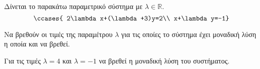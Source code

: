Δίνεται το παρακάτω παραμετρικό σύστημα με $ \lambda\in\mathbb{R} $.
\[ \ccases{
2\lambda x+(\lambda+3)y=2\\
x+\lambda y=-1} \]
\begin{rlist}
\item Να βρεθούν οι τιμές της παραμέτρου $ \lambda $ για τις οποίες το σύστημα έχει μοναδική λύση η οποία και να βρεθεί.
\item Για τις τιμές $ \lambda=4 $ και $ \lambda=-1 $ να βρεθεί η μοναδική λύση του συστήματος.
\end{rlist}